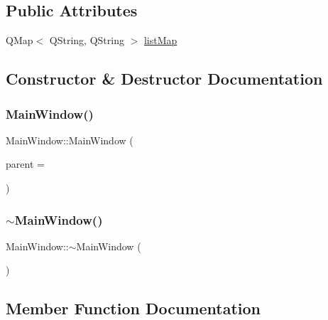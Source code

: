 \subsection*{Public Attributes}
\begin{DoxyCompactItemize}
\item 
Q\+Map$<$ Q\+String, Q\+String $>$ \mbox{\hyperlink{class_main_window_a2db0ce2c505362b3401a6243f6c8e5d4}{list\+Map}}
\end{DoxyCompactItemize}


\subsection{Constructor \& Destructor Documentation}
\mbox{\label{class_main_window_a8b244be8b7b7db1b08de2a2acb9409db}} 
\subsubsection{\texorpdfstring{MainWindow()}{MainWindow()}}
{\footnotesize\ttfamily Main\+Window\+::\+Main\+Window (\begin{DoxyParamCaption}\item[{Q\+Widget $\ast$}]{parent = {} }\end{DoxyParamCaption})\hspace{0.3cm}{\ttfamily [explicit]}}

\mbox{\label{class_main_window_ae98d00a93bc118200eeef9f9bba1dba7}} 
\subsubsection{\texorpdfstring{$\sim$MainWindow()}{~MainWindow()}}
{\footnotesize\ttfamily Main\+Window\+::$\sim$\+Main\+Window (\begin{DoxyParamCaption}{ }\end{DoxyParamCaption})}



\subsection{Member Function Documentation}
\mbox{\label{class_main_window_a221c04adbd574ca3d1256ba1a4db2a94}} 

